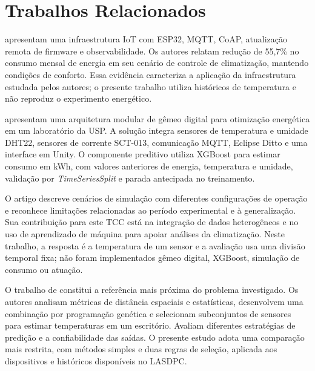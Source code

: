 \section{Trabalhos Relacionados}
\label{sec:trabalhos_relacionados}

 apresentam uma infraestrutura IoT com
ESP32, MQTT, CoAP, atualização remota de firmware e observabilidade.
Os autores relatam redução de 55,7\% no consumo mensal de energia em
seu cenário de controle de climatização, mantendo condições de conforto.
Essa evidência caracteriza a aplicação da infraestrutura estudada
pelos autores; o presente trabalho utiliza históricos de temperatura
e não reproduz o experimento energético.

 apresentam uma arquitetura modular
de gêmeo digital para otimização energética em um laboratório da USP.
A solução integra sensores de temperatura e umidade DHT22, sensores
de corrente SCT-013, comunicação MQTT, Eclipse Ditto e uma interface
em Unity. O componente preditivo utiliza XGBoost para estimar consumo
em kWh, com valores anteriores de energia, temperatura e umidade,
validação por \textit{TimeSeriesSplit} e parada antecipada no treinamento.

O artigo descreve cenários de simulação com diferentes configurações
de operação e reconhece limitações relacionadas ao período experimental
e à generalização. Sua contribuição para este TCC está na integração
de dados heterogêneos e no uso de aprendizado de máquina para apoiar
análises da climatização. Neste trabalho, a resposta é a temperatura
de um sensor e a avaliação usa uma divisão temporal fixa; não foram
implementados gêmeo digital, XGBoost, simulação de consumo ou atuação.

O trabalho de  constitui a referência mais próxima
do problema investigado. Os autores analisam métricas de distância
espaciais e estatísticas, desenvolvem uma combinação por programação
genética e selecionam subconjuntos de sensores para estimar temperaturas
em um escritório. Avaliam diferentes estratégias de predição e a
confiabilidade das saídas. O presente estudo adota uma comparação mais
restrita, com métodos simples e duas regras de seleção, aplicada aos
dispositivos e históricos disponíveis no LASDPC.

